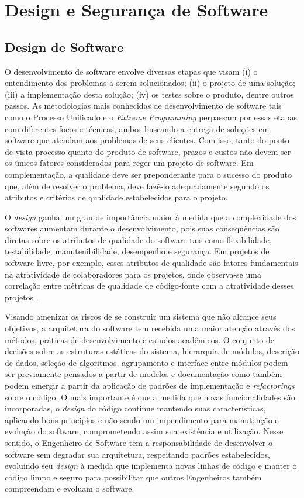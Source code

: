 \chapter{Design e Segurança de Software}
\label{cap-metrics}

\section{Design de Software}
\label{sec-design-sw}

O desenvolvimento de software envolve diversas etapas que visam (i) o entendimento dos problemas a serem solucionados; (ii) o projeto de uma solução; (iii) a implementação desta solução; (iv) os testes sobre o produto, dentre outros passos.
%
As metodologias mais conhecidas de desenvolvimento de software tais como o Processo Unificado e o \emph{Extreme Programming} perpassam por essas etapas com diferentes focos e técnicas, ambos buscando a entrega de soluções em software que atendam aos problemas de seus clientes.
%
Com isso, tanto do ponto de vista processo quanto do produto de software, prazos e custos não devem ser os únicos fatores considerados para reger um projeto de software. Em complementação, a qualidade deve ser preponderante para o sucesso do produto que, além de resolver o problema, deve fazê-lo adequadamente segundo os atributos e critérios de qualidade estabelecidos para o projeto.

%

O \emph{design} ganha um grau de importância maior à medida que a complexidade dos softwares aumentam durante o desenvolvimento, pois suas consequências são diretas sobre os atributos de qualidade do software tais como flexibilidade, testabilidade, manutenibilidade, desempenho e segurança. Em projetos de software livre, por exemplo, esses atributos de qualidade são fatores fundamentais na atratividade de colaboradores para os projetos, onde observa-se uma correlação entre métricas de qualidade de código-fonte com a atratividade desses projetos \cite{meirelles2010sbes}.


Visando amenizar os riscos de se construir um sistema que não alcance seus objetivos, a arquitetura do software tem recebida uma maior atenção através dos métodos, práticas de desenvolvimento e estudos acadêmicos.
%
O conjunto de decisões sobre as estruturas estáticas do sistema, hierarquia de módulos, descrição de dados, seleção de algoritmos, agrupamento e interface entre módulos podem ser previamente pensados a partir de modelos e documentação como também podem emergir a partir da aplicação de padrões de implementação e \emph{refactorings} sobre o código.
%
O mais importante é que a medida que novas funcionalidades são incorporadas, o \emph{design} do código continue mantendo suas características, aplicando bons princípios e não sendo um impendimento para manutenção e evolução do software, comprometendo assim sua existência e utilização.
%
Nesse sentido, o Engenheiro de Software tem a responsabilidade de desenvolver o software sem degradar sua arquitetura, respeitando padrões estabelecidos, evoluindo seu \emph{design} à medida que implementa novas linhas de código e manter o código limpo e seguro para possibilitar que outros Engenheiros também compreendam e evoluam o software.

